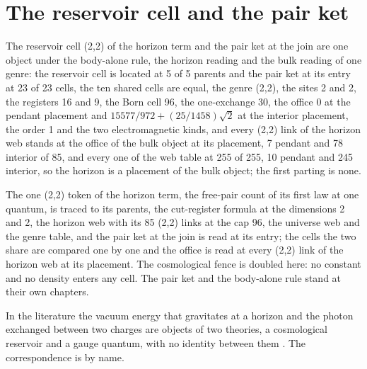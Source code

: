 \section{The reservoir cell and the pair ket}\label{mod:X-6-D541128-rcpm-t1}
\begin{chtheorem}\label{box:X-6-D541128-rcpm-t1:1}
The reservoir cell (2,2) of the horizon term and the pair ket at the join are one object under the body-alone rule, the horizon reading and the bulk reading of one genre: the reservoir cell is located at 5 of 5 parents and the pair ket at its entry at 23 of 23 cells, the ten shared cells are equal, the genre (2,2), the sites 2 and 2, the registers 16 and 9, the Born cell 96, the one-exchange 30, the office 0 at the pendant placement and $15577/972 + (25/1458)\sqrt{2}$ at the interior placement, the order 1 and the two electromagnetic kinds, and every (2,2) link of the horizon web stands at the office of the bulk object at its placement, 7 pendant and 78 interior of 85, and every one of the web table at 255 of 255, 10 pendant and 245 interior, so the horizon is a placement of the bulk object; the first parting is none.
\end{chtheorem}
The one (2,2) token of the horizon term, the free-pair count of its first law at one quantum, is traced to its parents, the cut-register formula at the dimensions 2 and 2, the horizon web with its 85 (2,2) links at the cap 96, the universe web and the genre table, and the pair ket at the join is read at its entry; the cells the two share are compared one by one and the office is read at every (2,2) link of the horizon web at its placement. The cosmological fence is doubled here: no constant and no density enters any cell. The pair ket and the body-alone rule stand at their own chapters.
\begin{chbridge}
In the literature the vacuum energy that gravitates at a horizon and the photon exchanged between two charges are objects of two theories, a cosmological reservoir and a gauge quantum, with no identity between them \cite{Weinberg1987,Peskin1995}. The correspondence is by name.
\end{chbridge}
